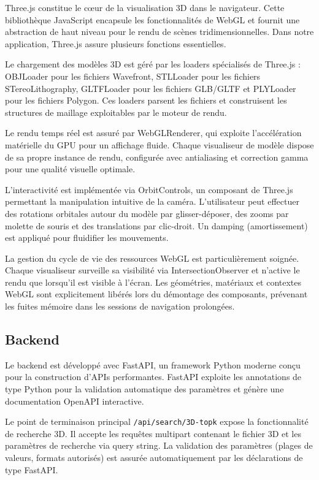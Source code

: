 \documentclass[11pt,a4paper,oneside]{report}
\begin{document}
Three.js constitue le cœur de la visualisation 3D dans le navigateur. Cette bibliothèque JavaScript encapsule les fonctionnalités de WebGL et fournit une abstraction de haut niveau pour le rendu de scènes tridimensionnelles. Dans notre application, Three.js assure plusieurs fonctions essentielles.

Le chargement des modèles 3D est géré par les loaders spécialisés de Three.js : OBJLoader pour les fichiers Wavefront, STLLoader pour les fichiers STereoLithography, GLTFLoader pour les fichiers GLB/GLTF et PLYLoader pour les fichiers Polygon. Ces loaders parsent les fichiers et construisent les structures de maillage exploitables par le moteur de rendu.

Le rendu temps réel est assuré par WebGLRenderer, qui exploite l'accélération matérielle du GPU pour un affichage fluide. Chaque visualiseur de modèle dispose de sa propre instance de rendu, configurée avec antialiasing et correction gamma pour une qualité visuelle optimale.

L'interactivité est implémentée via OrbitControls, un composant de Three.js permettant la manipulation intuitive de la caméra. L'utilisateur peut effectuer des rotations orbitales autour du modèle par glisser-déposer, des zooms par molette de souris et des translations par clic-droit. Un damping (amortissement) est appliqué pour fluidifier les mouvements.

La gestion du cycle de vie des ressources WebGL est particulièrement soignée. Chaque visualiseur surveille sa visibilité via IntersectionObserver et n'active le rendu que lorsqu'il est visible à l'écran. Les géométries, matériaux et contextes WebGL sont explicitement libérés lors du démontage des composants, prévenant les fuites mémoire dans les sessions de navigation prolongées.

\subsection{Backend}

Le backend est développé avec FastAPI, un framework Python moderne conçu pour la construction d'APIs performantes. FastAPI exploite les annotations de type Python pour la validation automatique des paramètres et génère une documentation OpenAPI interactive.

Le point de terminaison principal \texttt{/api/search/3D-topk} expose la fonctionnalité de recherche 3D. Il accepte les requêtes multipart contenant le fichier 3D et les paramètres de recherche via query string. La validation des paramètres (plages de valeurs, formats autorisés) est assurée automatiquement par les déclarations de type FastAPI.
\end{document}
